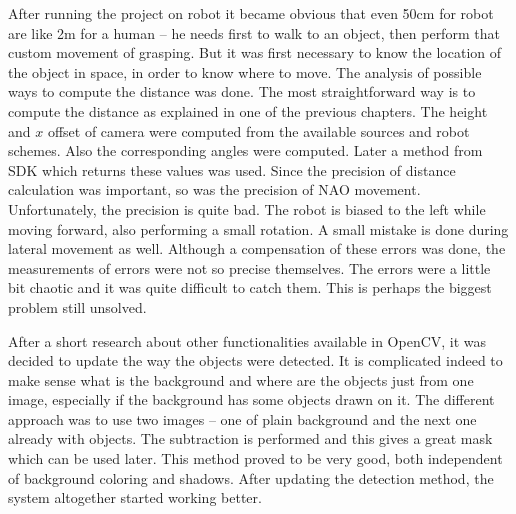         After running the project on robot it became obvious that even 50cm for robot are like 2m for a human -- he needs first to walk to an object, then perform that custom movement of grasping. But it was first necessary to know the location of the object in space, in order to know where to move. The analysis of possible ways to compute the distance was done. The most straightforward way is to compute the distance as explained in one of the previous chapters. The height and \( x \) offset of camera were computed from the available sources and robot schemes. Also the corresponding angles were computed. Later a method from SDK which returns these values was used. Since the precision of distance calculation was important, so was the precision of NAO movement. Unfortunately, the precision is quite bad. The robot is biased to the left while moving forward, also performing a small rotation. A small mistake is done during lateral movement as well. Although a compensation of these errors was done, the measurements of errors were not so precise themselves. The errors were a little bit chaotic and it was quite difficult to catch them. This is perhaps the biggest problem still unsolved. 

        After a short research about other functionalities available in OpenCV, it was decided to update the way the objects were detected. It is complicated indeed to make sense what is the background and where are the objects just from one image, especially if the background has some objects drawn on it. The different approach was to use two images -- one of plain background and the next one already with objects. The subtraction is performed and this gives a great mask which can be used later. This method proved to be very good, both independent of background coloring and shadows. After updating the detection method, the system altogether started working better. 


